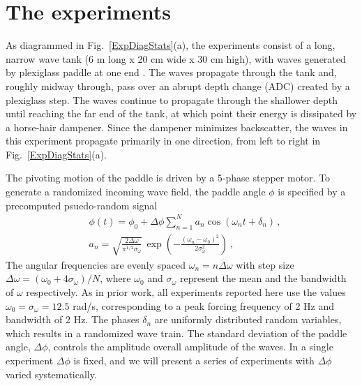 \documentclass[11pt]{article}
\newcommand{\omavg}{\omega_0}
\newcommand{\omsig}{\sigma_{\omega}}
\newcommand{\Dphi}{\Delta \phi}
\begin{document}
\section{The experiments}
\label{experiments}

	As diagrammed in Fig.~\ref{ExpDiagStats}(a), the experiments consist of a long, narrow wave tank (6 m long x 20 cm wide x 30 cm high), with waves generated by plexiglass paddle at one end \cite{bolles2019}. The waves propagate through the tank and, roughly midway through, pass over an abrupt depth change (ADC) created by a plexiglass step. The waves continue to propagate through the shallower depth until reaching the far end of the tank, at which point their energy is dissipated by a horse-hair dampener. Since the dampener minimizes backscatter, the waves in this experiment propagate primarily in one direction, from left to right in Fig.~\ref{ExpDiagStats}(a). 

The pivoting motion of the paddle is driven by a 5-phase stepper motor. To generate a randomized incoming wave field, the paddle angle $\phi$ is specified by a precomputed psuedo-random signal
\begin{align}
\label{PaddleAngle}
& \phi(t) = \phi_0 + \Dphi \sum_{n=1}^N a_n \cos(\omega_n t+\delta_n) \, , \\
\label{anEq}
& a_n = \sqrt{\frac{2 \Delta \omega}{\pi^{1/2} \omsig}} \, 
\exp \left( -\frac{(\omega_n - \omavg)^2}{2 \omsig^2} \right) \, ,
\end{align}
The angular frequencies are evenly spaced $\omega_n = n  \Delta \omega$ with step size $ \Delta \omega = (\omavg+4 \omsig)/N$, where $\omavg$ and $\omsig$ represent the mean and the bandwidth of $\omega$ respectively. As in prior work, all experiments reported here use the values $\omavg = \omsig = 12.5$ rad/s, corresponding to a peak forcing frequency of 2 Hz and bandwidth of 2 Hz. The phases $\delta_n$ are uniformly distributed random variables, which results in a randomized wave train. The standard deviation of the paddle angle, $\Dphi$, controls the amplitude overall amplitude of the waves. In a single experiment $\Dphi$ is fixed, and we will present a series of experiments with $\Dphi$ varied systematically. 
\end{document}

